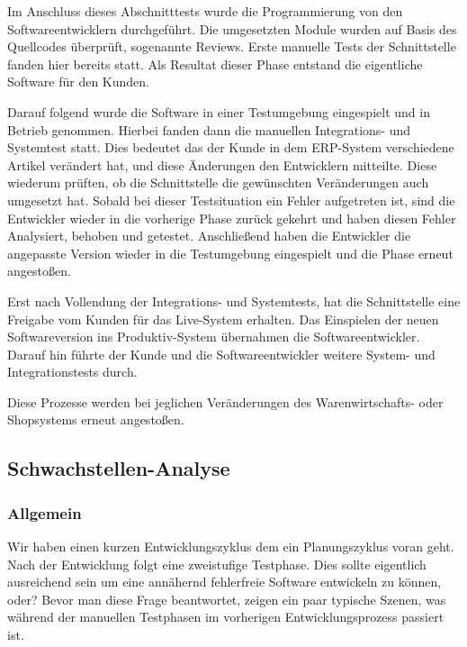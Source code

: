 Im Anschluss dieses Abschnitttests wurde die Programmierung von den Softwareentwicklern durchgeführt. Die umgesetzten Module wurden auf Basis des Quellcodes überprüft, sogenannte Reviews. Erste manuelle Tests der Schnittstelle fanden hier bereits statt. Als Resultat dieser Phase entstand die eigentliche Software für den Kunden. 

Darauf folgend wurde die Software in einer Testumgebung eingespielt und in Betrieb genommen. Hierbei fanden dann die manuellen Integrations- und Systemtest statt. Dies bedeutet das der Kunde in dem ERP-System verschiedene Artikel verändert hat, und diese Änderungen den Entwicklern mitteilte. Diese wiederum prüften, ob die Schnittstelle die gewünschten Veränderungen auch umgesetzt hat. Sobald bei dieser Testsituation ein Fehler aufgetreten ist, sind die Entwickler wieder in die vorherige Phase zurück gekehrt und haben diesen Fehler Analysiert, behoben und getestet. Anschließend haben die Entwickler die angepasste Version wieder in die Testumgebung eingespielt und die Phase erneut angestoßen.

Erst nach Vollendung der Integrations- und Systemtests, hat die Schnittstelle eine Freigabe vom Kunden für das Live-System erhalten. Das Einspielen der neuen Softwareversion ins Produktiv-System übernahmen die Softwareentwickler. Darauf hin führte der Kunde und die Softwareentwickler weitere System- und Integrationstests durch.

Diese Prozesse werden bei jeglichen Veränderungen des Warenwirtschafts- oder Shopsystems erneut angestoßen. 

\subsection{Schwachstellen-Analyse}
\subsubsection{Allgemein}
Wir haben einen kurzen Entwicklungszyklus dem ein Planungszyklus voran geht. Nach der Entwicklung folgt eine zweistufige Testphase. Dies sollte eigentlich ausreichend sein um eine annähernd fehlerfreie Software entwickeln zu können, oder? Bevor man diese Frage beantwortet, zeigen ein paar typische Szenen, was während der manuellen Testphasen im vorherigen Entwicklungsprozess passiert ist.


